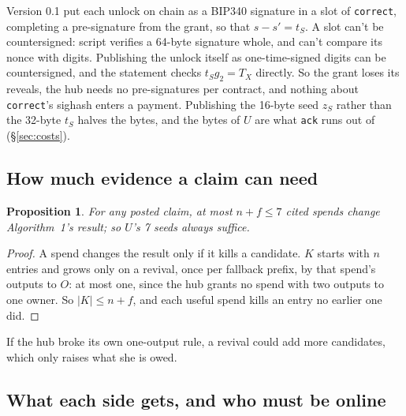 \documentclass[11pt]{article}
\theoremstyle{plain}
\newtheorem{proposition}{Proposition}
\theoremstyle{definition}
\newcommand{\tx}[1]{\texttt{#1}}
\begin{document}
Version 0.1 put each unlock on chain as a BIP340 signature in a slot of
\tx{correct}, completing a pre-signature from the grant, so that $s - s'
= t_S$. A slot can't be countersigned: script verifies a 64-byte
signature whole, and can't compare its nonce with digits. Publishing
the unlock itself as one-time-signed digits can be countersigned, and
the statement checks $t_S g_2 = T_X$ directly. So the grant loses its
reveals, the hub needs no pre-signatures per contract, and nothing
about \tx{correct}'s sighash enters a payment. Publishing the 16-byte
seed $z_S$ rather than the 32-byte $t_S$ halves the bytes, and the
bytes of $U$ are what \tx{ack} runs out of (\S\ref{sec:costs}).

\subsection{How much evidence a claim can need}\label{sec:volume}

\begin{proposition}\label{prop:volume}
For any posted claim, at most $n + f \le 7$ cited spends change
Algorithm~1's result; so $U$'s 7 seeds always suffice.
\end{proposition}
\begin{proof}
A spend changes the result only if it kills a candidate. $K$ starts with
$n$ entries and grows only on a revival, once per fallback prefix, by
that spend's outputs to $O$: at most one, since the hub grants no spend
with two outputs to one owner. So $|K| \le n + f$, and each useful
spend kills an entry no earlier one did.
\end{proof}

If the hub broke its own one-output rule, a revival could add more
candidates, which only raises what she is owed.

\subsection{What each side gets, and who must be online}\label{sec:who}
\end{document}

